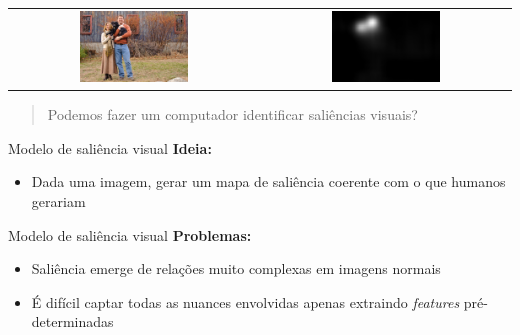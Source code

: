 \documentclass[10pt]{beamer}
\newcommand{\tit}[1]{\textit{#1}}
\newcommand{\tbf}[1]{\textbf{#1}}
\begin{document}
\begin{frame}{}
    \begin{center}
        \begin{tabular} {cc}
        \includegraphics[width=0.45\textwidth]{./img/couple.jpg} &
        \includegraphics[width=0.45\textwidth]{./img/couple_map.jpg}
        \end{tabular}
    \end{center}
\end{frame}

\begin{frame}{}
    \begin{quote}
        Podemos fazer um computador identificar saliências visuais?
    \end{quote}
\end{frame}

\begin{frame}{Modelo de saliência visual}
    \tbf{Ideia:}
    \begin{itemize}[<+->]
        \item Dada uma imagem, gerar um mapa de saliência coerente
            com o que humanos gerariam
    \end{itemize}
\end{frame}

\begin{frame}{Modelo de saliência visual}
    \tbf{Problemas:}
    \begin{itemize}[<+->]
        \item Saliência emerge de relações muito complexas em imagens normais
        \item É difícil captar todas as nuances envolvidas apenas extraindo
            \tit{features} pré-determinadas
    \end{itemize}
\end{frame}
\end{document}
